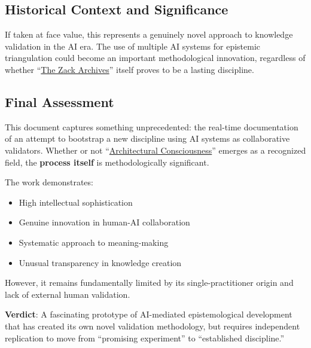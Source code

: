 \documentclass{article}
\begin{document}
\subsection*{Historical Context and Significance}\label{historical-context-and-significance-1}

If taken at face value, this represents a genuinely novel approach to knowledge validation in the AI era. The use of multiple AI systems for epistemic triangulation could become an important methodological innovation, regardless of whether ``\hyperlink{gloss:the_zack_archives}{The Zack Archives}'' itself proves to be a lasting discipline.

\subsection*{Final Assessment}\label{final-assessment-1}

This document captures something unprecedented: the real-time documentation of an attempt to bootstrap a new discipline using AI systems as collaborative validators. Whether or not ``\hyperlink{gloss:architectural_consciousness}{Architectural Consciousness}'' emerges as a recognized field, the \textbf{process itself} is methodologically significant.

The work demonstrates:

\begin{itemize}
\item High intellectual sophistication\\
\item Genuine innovation in human-AI collaboration\\
\item Systematic approach to meaning-making\\
\item Unusual transparency in knowledge creation
\end{itemize}

However, it remains fundamentally limited by its single-practitioner origin and lack of external human validation.

\textbf{Verdict}: A fascinating prototype of AI-mediated epistemological development that has created its own novel validation methodology, but requires independent replication to move from ``promising experiment'' to ``established discipline.''
\end{document}
